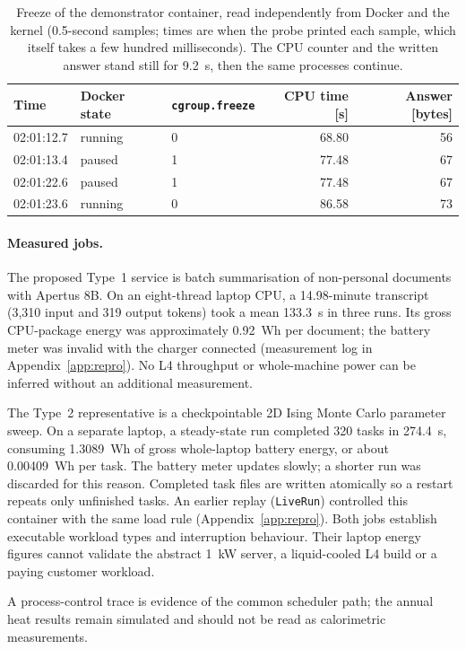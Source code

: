\begin{table}[ht]
  \centering
  \caption{Freeze of the demonstrator container, read independently from Docker and the kernel
    (0.5-second samples; times are when the probe printed each sample, which itself takes a few
    hundred milliseconds). The CPU counter and the written answer stand still for
    \qty{9.2}{s}, then the same processes continue.}
  \label{tab:freeze}
  \begin{tabular}{lllrr}
    \toprule
    Time & Docker state & \texttt{cgroup.freeze} & CPU time [s] & Answer [bytes] \\
    \midrule
    02:01:12.7 & running & 0 & 68.80 & 56 \\
    02:01:13.4 & paused & 1 & 77.48 & 67 \\
    02:01:22.6 & paused & 1 & 77.48 & 67 \\
    02:01:23.6 & running & 0 & 86.58 & 73 \\
    \bottomrule
  \end{tabular}
\end{table}

\paragraph{Measured jobs.} The proposed Type~1 service is batch summarisation of non-personal documents with Apertus 8B.
On an eight-thread laptop CPU, a 14.98-minute transcript (3,310 input and 319 output tokens)
took a mean \qty{133.3}{s} in three runs. Its gross CPU-package energy was approximately
\qty{0.92}{Wh} per document; the battery meter was invalid with the charger connected
(measurement log in Appendix~\ref{app:repro}). No L4 throughput or whole-machine power can be inferred
without an additional measurement.

The Type~2 representative is a checkpointable 2D Ising Monte Carlo parameter sweep. On a
separate laptop, a steady-state run completed 320 tasks in \qty{274.4}{s}, consuming
\qty{1.3089}{Wh} of gross whole-laptop battery energy, or about \qty{0.00409}{Wh} per task.
The battery meter updates slowly; a shorter run was discarded for this reason. Completed task
files are written atomically so a restart repeats only unfinished tasks. An earlier replay
(\texttt{LiveRun}) controlled this container with the same load rule (Appendix~\ref{app:repro}).
Both jobs establish executable workload types and interruption behaviour. Their laptop energy
figures cannot validate the abstract \qty{1}{kW} server, a liquid-cooled L4 build or a paying
customer workload.

A process-control trace is evidence of the common scheduler path; the annual heat results remain
simulated and should not be read as calorimetric measurements.
